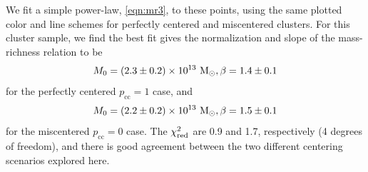We fit a simple power-law, \autoref{eqn:mr3}, to these points, using the same plotted color and line schemes for perfectly centered and miscentered clusters. For this cluster sample, we find the best fit gives the normalization and slope of the mass-richness relation to be
\begin{equation}
M_0 = (2.3 \pm 0.2) \times 10^{13}\ {\rm M}_\odot, \beta = 1.4 \pm 0.1
\end{equation}
for the perfectly centered $p_{\mathrm{cc}}=1$ case, and
\begin{equation}
M_0 = (2.2 \pm 0.2) \times 10^{13}\ {\rm M}_\odot, \beta = 1.5 \pm 0.1
\end{equation}
for the miscentered $p_{\mathrm{cc}}=0$ case. The $\chi^2_{\rm red}$ are 0.9 and 1.7, respectively (4 degrees of freedom), and there is good agreement between the two different centering scenarios explored here.

